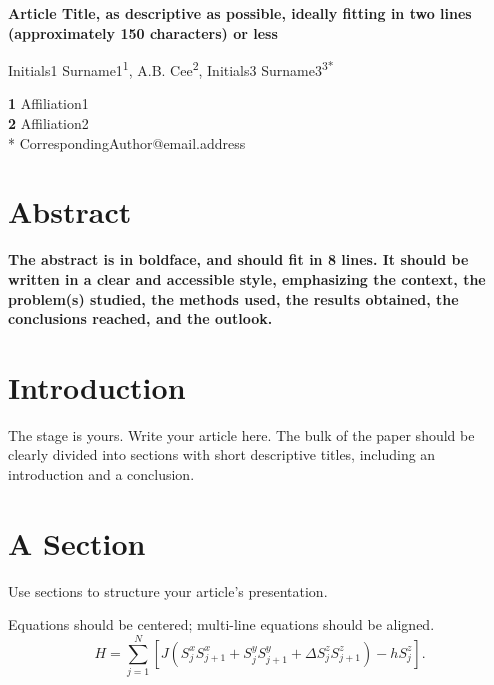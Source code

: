 \documentclass[submission]{SciPost}
\begin{document}
\begin{center}{\Large \textbf{
Article Title, as descriptive as possible, ideally fitting in two lines (approximately 150 characters) or less
}}\end{center}

\begin{center}
Initials1 Surname1\textsuperscript{1}, 
A.B. Cee\textsuperscript{2}, 
Initials3 Surname3\textsuperscript{3*}
\end{center}

\begin{center}
{\bf 1} Affiliation1
\\
{\bf 2} Affiliation2
\\
* CorrespondingAuthor@email.address
\bigskip
\end{center}

\linenumbers

\section*{Abstract}
{\bf 
The abstract is in boldface, and should fit in 8 lines.
It should be written in a clear and accessible style, emphasizing the context, the problem(s) studied, the methods used, the results obtained, the conclusions reached, and the outlook. 
}

\section{Introduction}
The stage is yours. Write your article here.
The bulk of the paper should be clearly divided into sections with short descriptive titles, including an introduction and a conclusion.


\section{A Section}
Use sections to structure your article's presentation. 

Equations should be centered; multi-line equations should be aligned.
\begin{equation}
H = \sum_{j=1}^N \left[J (S^x_j S^x_{j+1} + S^y_j S^y_{j+1} + \Delta S^z_j S^z_{j+1}) - h S^z_j \right].
\end{equation}
\end{document}
